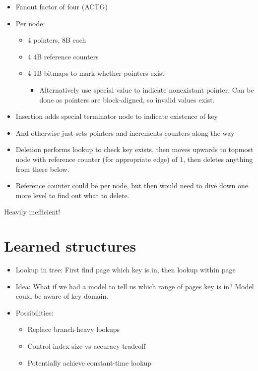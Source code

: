 \documentclass[a4paper]{scrreprt}
\begin{document}
\begin{itemize}
		\item Fanout factor of four (ACTG)
		\item Per node:
				\begin{itemize}
						\item 4 pointers, 8B each
						\item 4 4B reference counters
						\item 4 1B bitmaps to mark whether pointers exist
								\begin{itemize}
										\item Alternatively use special value
												to indicate nonexistant
												pointer. Can be done as
												pointers are block-aligned, so
												invalid values exist.
								\end{itemize}
				\end{itemize}
		\item Insertion adds special terminator node to indicate existence of key
		\item And otherwise just sets pointers and increments counters along
				the way
		\item Deletion performs lookup to check key exists, then moves upwards
				to topmost node with reference counter (for appropriate edge)
				of 1, then deletes anything from there below.
		\item Reference counter could be per node, but then would need to dive
				down one more level to find out what to delete.
\end{itemize}

Heavily inefficient!

\chapter{Learned structures}

\begin{itemize}
		\item Lookup in tree: First find page which key is in, then lookup within page
		\item Idea: What if we had a model to tell us which range of pages key
				is in? Model could be aware of key domain.
		\item Possibilities:
				\begin{itemize}
						\item Replace branch-heavy lookups
						\item Control index size vs accuracy tradeoff
						\item Potentially achieve constant-time lookup
				\end{itemize}
\end{itemize}
\end{document}
